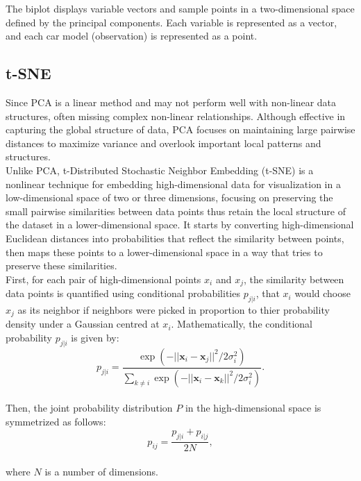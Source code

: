 \documentclass{article}\usepackage[]{graphicx}\usepackage[]{xcolor}
\numberwithin{equation}{section}
\begin{document}
{\noindent The biplot displays variable vectors and sample points in a two-dimensional space defined by the principal components. Each variable is represented as a vector, and each car model (observation) is represented as a point.

\subsection{t-SNE}
\href{https://jmlr.org/papers/volume9/vandermaaten08a/vandermaaten08a.pdf}

\noindent
Since PCA is a linear method and may not perform well with non-linear data structures, often missing complex non-linear relationships. Although effective in capturing the global structure of data, PCA focuses on maintaining large pairwise distances to maximize variance and overlook important local patterns and structures. \\

\noindent
Unlike PCA, t-Distributed Stochastic Neighbor Embedding (t-SNE) is a nonlinear technique for embedding high-dimensional data for visualization in a low-dimensional space of two or three dimensions, focusing on preserving the small pairwise similarities between data points thus retain the local structure of the dataset in a lower-dimensional space. It starts by converting high-dimensional Euclidean distances into probabilities that reflect the similarity between points, then maps these points to a lower-dimensional space in a way that tries to preserve these similarities.\\

\noindent
First, for each pair of high-dimensional points $x_i$ and $x_j$, the similarity between data points is quantified using conditional probabilities $p_{j|i}$, that $x_i$ would choose $x_j$ as its neighbor if neighbors were picked in proportion to thier probability density under a Gaussian centred at $x_i$. Mathematically, the conditional probability $p_{j|i}$ is given by:
    \[
        p_{j|i} = \frac{\exp(-||\mathbf{x}_i - \mathbf{x}_j||^2 / 2\sigma_i^2)}{\sum_{k \neq i}\exp(-||\mathbf{x}_i - \mathbf{x}_k||^2 / 2\sigma_i^2)}.
    \] \\

\noindent
Then, the joint probability distribution $P$ in the high-dimensional space is symmetrized as follows:
    \[
        p_{ij} = \frac{p_{j|i} + p_{i|j}}{2N},
    \] \\
\noindent
where $N$ is a number of dimensions.\\

}
\end{document}

